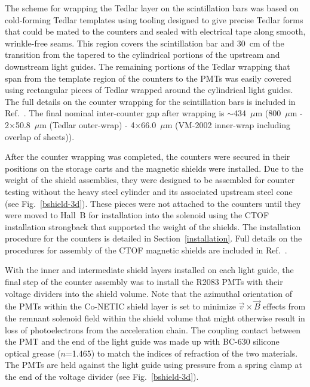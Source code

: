 \documentclass{elsart}
\begin{document}
The scheme for wrapping the Tedlar layer on the scintillation bars was based on cold-forming 
Tedlar templates using tooling designed to give precise Tedlar forms that could be mated to the 
counters and sealed with electrical tape along smooth, wrinkle-free seams.  This region covers the 
scintillation bar and 30~cm of the transition from the tapered to the cylindrical portions of the
upstream and downstream light guides. The remaining portions of the Tedlar wrapping that span
from the template region of the counters to the PMTs was easily covered using rectangular pieces
of Tedlar wrapped around the cylindrical light guides. The full details on the counter wrapping for
the scintillation bars is included in Ref.~\cite{ctof-wrapping}. The final nominal inter-counter gap
after wrapping is $\sim$434~$\mu$m (800~$\mu$m - 2$\times$50.8~$\mu$m (Tedlar
outer-wrap) - 4$\times$66.0~$\mu$m (VM-2002 inner-wrap including overlap of sheets)).

After the counter wrapping was completed, the counters were secured in their positions on the
storage carts and the magnetic shields were installed. Due to the weight of the shield assemblies,
they were designed to be assembled for counter testing without the heavy steel cylinder and its
associated upstream steel cone (see Fig.~\ref{bshield-3d}). These pieces were not attached to the
counters until they were moved to Hall~B for installation into the solenoid using the CTOF installation
strongback that supported the weight of the shields. The installation procedure for the counters is
detailed in Section~\ref{installation}. Full details on the procedures for assembly of the CTOF
magnetic shields are included in Ref.~\cite{ctof-sh-assy}.

With the inner and intermediate shield layers installed on each light guide, the final step of the
counter assembly was to install the R2083 PMTs with their voltage dividers into the shield volume.
Note that the azimuthal orientation of the PMTs within the Co-NETIC shield layer is set to
minimize $\vec{v} \times \vec{B}$ effects from the remnant solenoid field within the shield volume
that might otherwise result in loss of photoelectrons from the acceleration chain. The coupling contact
between the PMT and the end of the light guide was made up with BC-630 silicone optical grease
\cite{bc-630} ($n$=1.465) to match the indices of refraction of the two materials. The PMTs are
held against the light guide using pressure from a spring clamp at the end of the voltage divider (see
Fig.~\ref{bshield-3d}).
\end{document}

